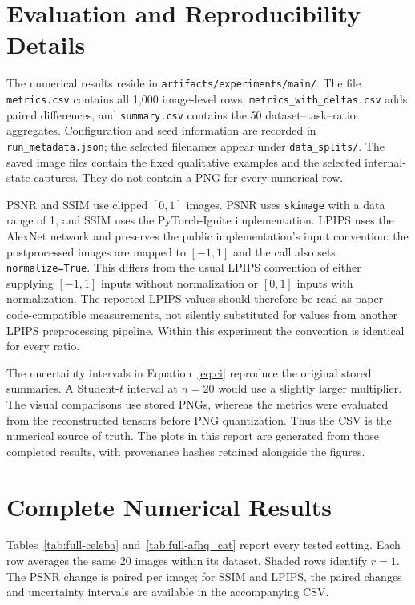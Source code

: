 \documentclass[10pt,letterpaper]{article}
\begin{document}
\section{Evaluation and Reproducibility Details}
The numerical results reside in \texttt{artifacts/experiments/main/}. The file \texttt{metrics.csv} contains all 1,000 image-level rows, \texttt{metrics\_with\_deltas.csv} adds paired differences, and \texttt{summary.csv} contains the 50 dataset--task--ratio aggregates. Configuration and seed information are recorded in \texttt{run\_metadata.json}; the selected filenames appear under \texttt{data\_splits/}. The saved image files contain the fixed qualitative examples and the selected internal-state captures. They do not contain a PNG for every numerical row.

PSNR and SSIM use clipped $[0,1]$ images. PSNR uses \texttt{skimage} with a data range of 1, and SSIM uses the PyTorch-Ignite implementation. LPIPS uses the AlexNet network and preserves the public implementation's input convention: the postprocessed images are mapped to $[-1,1]$ and the call also sets \texttt{normalize=True}. This differs from the usual LPIPS convention of either supplying $[-1,1]$ inputs without normalization or $[0,1]$ inputs with normalization. The reported LPIPS values should therefore be read as paper-code-compatible measurements, not silently substituted for values from another LPIPS preprocessing pipeline. Within this experiment the convention is identical for every ratio.

The uncertainty intervals in Equation~\eqref{eq:ci} reproduce the original stored summaries. A Student-$t$ interval at $n=20$ would use a slightly larger multiplier. The visual comparisons use stored PNGs, whereas the metrics were evaluated from the reconstructed tensors before PNG quantization. Thus the CSV is the numerical source of truth. The plots in this report are generated from those completed results, with provenance hashes retained alongside the figures.

\section{Complete Numerical Results}\label{app:full}
Tables~\ref{tab:full-celeba} and~\ref{tab:full-afhq_cat} report every tested setting. Each row averages the same 20 images within its dataset. Shaded rows identify $r=1$. The PSNR change is paired per image; for SSIM and LPIPS, the paired changes and uncertainty intervals are available in the accompanying CSV.
\end{document}
